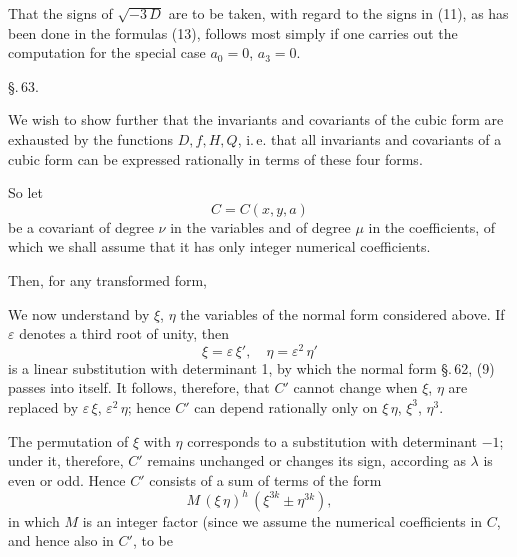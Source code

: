 That the signs of $\sqrt{-3\,D}$ are to be taken, with regard to the signs in (11), as has been done in the formulas (13), follows most simply if one carries out the computation for the special case $a_0 = 0$, $a_3 = 0$.

\begin{center}
\S.\,63.
\end{center}

\begin{center}
\end{center}

We wish to show further that the invariants and covariants of the cubic form are exhausted by the functions $D, f, H, Q$, i.\,e. that all invariants and covariants of a cubic form can be expressed rationally in terms of these four forms.

So let
\[
C = C(x,y,a)
\]
be a covariant of degree $\nu$ in the variables and of degree $\mu$ in the coefficients, of which we shall assume that it has only integer numerical coefficients.

Then, for any transformed form,

We now understand by $\xi$, $\eta$ the variables of the normal form considered above. If $\varepsilon$ denotes a third root of unity, then
\[
\xi = \varepsilon\,\xi',\quad \eta = \varepsilon^2\,\eta'
\]
is a linear substitution with determinant 1, by which the normal form \S.\,62, (9) passes into itself. It follows, therefore, that $C'$ cannot change when $\xi$, $\eta$ are replaced by $\varepsilon\,\xi$, $\varepsilon^2\,\eta$; hence $C'$ can depend rationally only on $\xi\,\eta$, $\xi^3$, $\eta^3$.

The permutation of $\xi$ with $\eta$ corresponds to a substitution with determinant $-1$; under it, therefore, $C'$ remains unchanged or changes its sign, according as $\lambda$ is even or odd. Hence $C'$ consists of a sum of terms of the form
\[
M\,(\xi\,\eta)^h\,(\xi^{3k} \pm \eta^{3k}),
\]
in which $M$ is an integer factor (since we assume the numerical coefficients in $C$, and hence also in $C'$, to be
